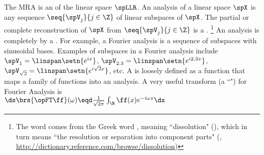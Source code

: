 The MRA is an  of the linear space $\spLLR$.
An analysis of a linear space $\spX$ is any sequence $\seq{\spV_j}{j\in\Z}$ of linear subspaces of $\spX$.
        The partial or complete reconstruction of $\spX$ from $\seq{\spV_j}{j\in\Z}$ is a .%
        \footnote{%
          The word  comes from the Greek word
          {},
          meaning ``dissolution" (),
          which in turn means
          ``the resolution or separation into component parts"
          (, \scs\url{http://dictionary.reference.com/browse/dissolution})
          }
  An analysis is completely  by a .
  For example, a Fourier analysis is a sequence of subspaces with sinusoidal bases.
  Examples of subspaces in a Fourier analysis include $\spV_1=\linspan\setn{e^{ix}}$, 
  $\spV_{2.3}=\linspan\setn{e^{i2.3x}}$, $\spV_{\sqrt{2}}=\linspan\setn{e^{i\sqrt{2}x}}$, etc.
  A  is loosely defined as a function that maps a family of functions
  into an analysis.
  A very useful transform (a ``") for Fourier Analysis is 
  \\\indentx$\ds\brs{\opFT\ff}(\omega) \eqd \frac{1}{\sqrt{2\pi}} \int_\R \ff(x) e^{-i\omega x} \dx$

